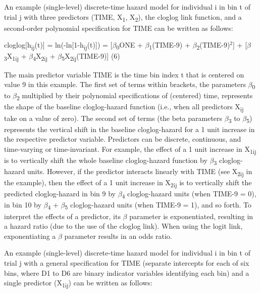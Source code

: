 \documentclass[
  man,floatsintext]{apa6}
\begin{document}
An example (single-level) discrete-time hazard model for individual i in bin t of trial j with three predictors (TIME, X\textsubscript{1}, X\textsubscript{2}), the cloglog link function, and a second-order polynomial specification for TIME can be written as follows:

\noindent cloglog{[}h\textsubscript{ij}(t){]} = ln(-ln{[}1-h\textsubscript{ij}(t){]}) = {[}\(\beta\)\textsubscript{0}ONE + \(\beta\)\textsubscript{1}(TIME-9) + \(\beta\)\textsubscript{2}(TIME-9)\(^2\){]} + {[}\(\beta\)\textsubscript{3}X\textsubscript{1ij} + \(\beta\)\textsubscript{4}X\textsubscript{2ij} + \(\beta\)\textsubscript{5}X\textsubscript{2ij}(TIME-9){]} \hfill  (6)

The main predictor variable TIME is the time bin index t that is centered on value 9 in this example. The first set of terms within brackets, the parameters \(\beta\)\textsubscript{0} to \(\beta\)\textsubscript{2} multiplied by their polynomial specifications of (centered) time, represents the shape of the baseline cloglog-hazard function (i.e., when all predictors X\textsubscript{ij} take on a value of zero). The second set of terms (the beta parameters \(\beta\)\textsubscript{3} to \(\beta\)\textsubscript{5}) represents the vertical shift in the baseline cloglog-hazard for a 1 unit increase in the respective predictor variable. Predictors can be discrete, continuous, and time-varying or time-invariant. For example, the effect of a 1 unit increase in X\textsubscript{1ij} is to vertically shift the whole baseline cloglog-hazard function by \(\beta\)\textsubscript{3} cloglog-hazard units. However, if the predictor interacts linearly with TIME (see X\textsubscript{2ij} in the example), then the effect of a 1 unit increase in X\textsubscript{2ij} is to vertically shift the predicted cloglog-hazard in bin 9 by \(\beta\)\textsubscript{4} cloglog-hazard units (when TIME-9 = 0), in bin 10 by \(\beta\)\textsubscript{4} + \(\beta\)\textsubscript{5} cloglog-hazard units (when TIME-9 = 1), and so forth. To interpret the effects of a predictor, its \(\beta\) parameter is exponentiated, resulting in a hazard ratio (due to the use of the cloglog link). When using the logit link, exponentiating a \(\beta\) parameter results in an odds ratio.

An example (single-level) discrete-time hazard model for individual i in bin t of trial j with a general specification for TIME (separate intercepts for each of six bins, where D1 to D6 are binary indicator variables identifying each bin) and a single predictor (X\textsubscript{1ij}) can be written as follows:
\end{document}
